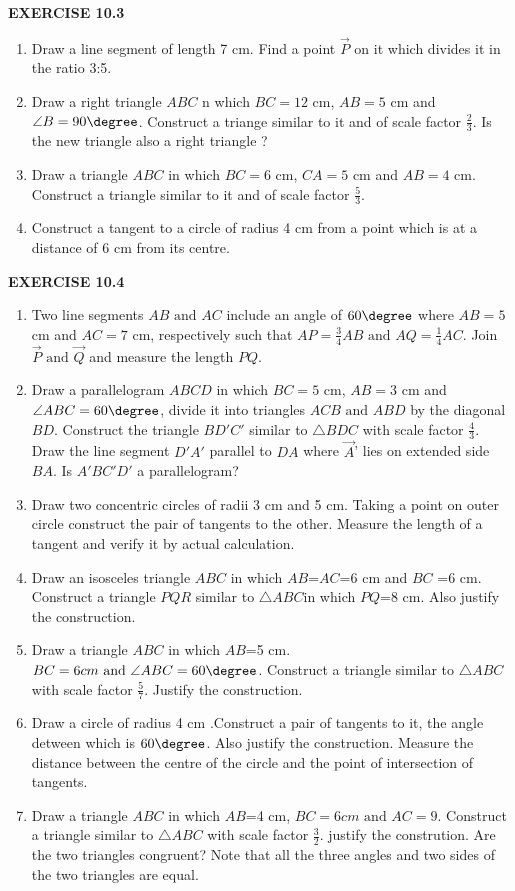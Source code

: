 \begin{center}                            \textbf{EXERCISE 10.3}                    \end{center}
	\begin{enumerate}
\item Draw a line segment of length 7 cm. Find a point $\vec{P}$ on it which divides it in the ratio 3:5.
\item Draw a right triangle ${ABC}$ n which $BC=12$ cm, $AB=5$ cm and $\angle{B}=90\degree$.
Construct a triange similar to it and of scale factor $\frac{2}{3}$. Is the new triangle also a right triangle ?
\item Draw a triangle ${ABC}$ in which $BC=6$ cm, $CA=5$ cm and $AB=4$ cm. Construct a triangle similar to it and of scale factor $\frac{5}{3}$.
\item Construct a tangent to a circle of radius 4 cm from a point which is at a distance of 6 cm from its centre.
	\end{enumerate}
	\begin{center}                            \textbf{EXERCISE 10.4}                    \end{center}
		\begin{enumerate}
\item Two line segments ${AB}\text{ and }{AC}$ include an angle of $60\degree$ where $AB=5$ cm and $AC=7$ cm, respectively such that $AP=\frac{3}{4}AB\text{ and }AQ=\frac{1}{4}AC$. Join $\vec{P}\text{ and }\vec{Q}$ and measure the length $PQ$.
\item Draw a parallelogram ${ABCD}$ in which $BC=5$ cm, $AB=3$ cm and $\angle{ABC}=60\degree$, divide it into triangles ${ACB}\text{ and }{ABD}$ by the diagonal $BD$. 
Construct the triangle $BD'C'$ similar to $\triangle{BDC}$ with scale factor $\frac{4}{3}$. Draw the line segment $D'A'$ parallel to $DA$ where $\vec{A}$' lies on extended side $BA$. Is $A'BC'D'$ a parallelogram? 
\item Draw two concentric circles of radii 3 cm and 5 cm. Taking a point on outer circle construct the pair of tangents to the other. Measure the length of a tangent and verify it by actual calculation.
\item Draw an isosceles triangle ${ABC}$ in which $AB$=$AC$=6 cm and $BC$ =6 cm. Construct a triangle $PQR$ similar to $\triangle{ABC}$in which $PQ$=8 cm. Also justify the construction.
\item Draw a triangle ${ABC}$ in which $AB$=5 cm. $BC=6 cm\text{ and }\angle {ABC}=60\degree$. Construct a triangle similar to $\triangle{ABC}$ with scale factor $\frac{5}{7}$. Justify the construction.
\item Draw a circle of radius 4 cm .Construct a pair of tangents to it, the angle detween which is $60\degree$. Also justify the construction. Measure the distance between the centre of the circle and the point of intersection of tangents.
\item Draw a triangle ${ABC}$ in which $AB$=4 cm, $BC=6 cm\text{ and }AC=9$. Construct a triangle similar to $\triangle{ABC}$ with scale factor $\frac{3}{2}$. justify the constrution. Are the two triangles congruent? Note that all the three angles and two sides of the two triangles are equal.

	\end{enumerate}
	\fi
